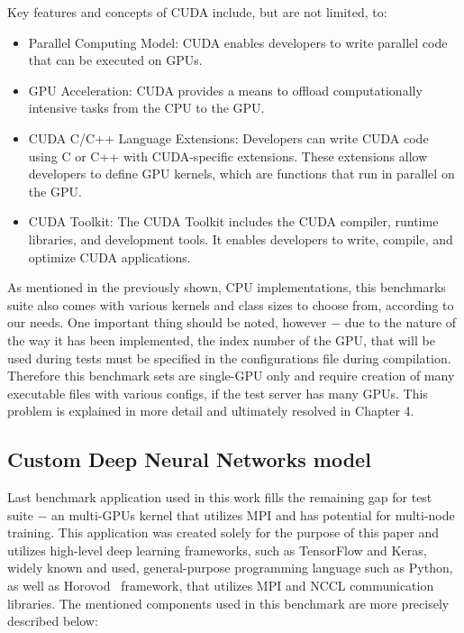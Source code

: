 Key features and concepts of CUDA include, but are not limited, to:
\begin{itemize}
    \item Parallel Computing Model: CUDA enables developers to write parallel
    code that can be executed on GPUs.
    \item GPU Acceleration: CUDA provides a means to offload computationally
    intensive tasks from the CPU to the GPU\@.
    \item CUDA C/C++ Language Extensions: Developers can write CUDA code using
    C or C++ with CUDA-specific extensions. These extensions allow developers
    to define GPU kernels, which are functions that run in parallel on the GPU\@.
    \item CUDA Toolkit: The CUDA Toolkit includes the CUDA compiler, runtime
    libraries, and development tools. It enables developers to write, compile,
    and optimize CUDA applications.
\end{itemize}

As mentioned in the previously shown, CPU implementations, this benchmarks
suite also comes with various kernels and class sizes to choose from, according
to our needs. One important thing should be noted, however $-$ due to the
nature of the way it has been implemented, the index number of the GPU, that
will be used during tests must be specified in the configurations file during
compilation. Therefore this benchmark sets are single-GPU only and require
creation of many executable files with various configs, if the test server
has many GPUs. This problem is explained in more detail and ultimately
resolved in Chapter 4.

\newpage

\subsection{Custom Deep Neural Networks model}

Last benchmark application used in this work fills the remaining gap for test
suite $-$ an multi-GPUs kernel that utilizes MPI and has potential for
multi-node training. This application was created solely for the purpose of
this paper and utilizes high-level deep learning frameworks, such as
TensorFlow and Keras, widely known and used, general-purpose programming
language such as Python, as well as Horovod~\cite{Horovod_IDRIS} framework,
that utilizes MPI and NCCL communication libraries. The mentioned components
used in this benchmark are more precisely described below:


